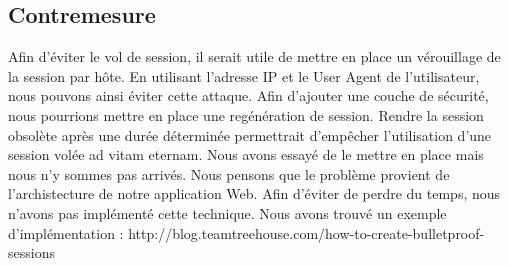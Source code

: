 \documentclass[12pt]{article}
\begin{document}
\subsection{Contremesure}\label{c9}

Afin d'éviter le vol de session, il serait utile de mettre en place un vérouillage de la session par hôte. En utilisant l'adresse IP et le User Agent de l'utilisateur, nous pouvons ainsi éviter cette attaque. Afin d'ajouter une couche de sécurité, nous pourrions mettre en place une regénération de session. Rendre la session obsolète après une durée déterminée permettrait d'empêcher l'utilisation d'une session volée ad vitam eternam.
Nous avons essayé de le mettre en place mais nous n'y sommes pas arrivés. Nous pensons que le problème provient de l'archistecture de notre application Web. Afin d'éviter de perdre du temps, nous n'avons pas implémenté cette technique.
Nous avons trouvé un exemple d'implémentation :
http://blog.teamtreehouse.com/how-to-create-bulletproof-sessions
\end{document}
